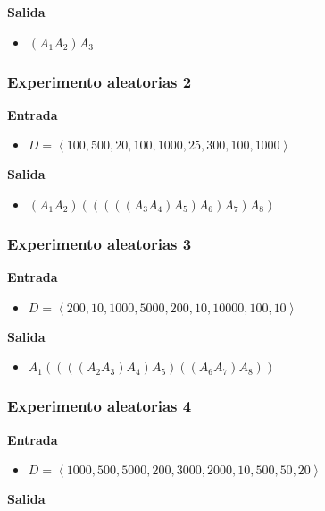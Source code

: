 \documentclass[letter]{article}
\begin{document}
\textbf{Salida}

\begin{itemize}
    \item $(A_1A_2)A_3$
\end{itemize}

\subsubsection{Experimento aleatorias 2}

\textbf{Entrada}

\begin{itemize}
    \item $D = \left< 100,500,20,100,1000,25,300,100,1000 \right>$
\end{itemize}

\textbf{Salida}

\begin{itemize}
    \item $(A_1A_2)(((((A_3A_4)A_5)A_6)A_7)A_8)$
\end{itemize}

\subsubsection{Experimento aleatorias 3}

\textbf{Entrada}

\begin{itemize}
    \item $D = \left< 200,10,1000,5000,200,10,10000,100,10 \right>$
\end{itemize}

\textbf{Salida}

\begin{itemize}
    \item $A_1((((A_2A_3)A_4)A_5)((A_6A_7)A_8))$
\end{itemize}

\subsubsection{Experimento aleatorias 4}

\textbf{Entrada}

\begin{itemize}
    \item $D = \left< 1000,500,5000,200,3000,2000,10,500,50,20 \right>$
\end{itemize}

\textbf{Salida}
\end{document}
